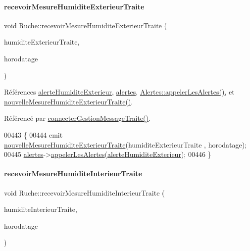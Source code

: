 \paragraph{\texorpdfstring{recevoir\+Mesure\+Humidite\+Exterieur\+Traite}{recevoirMesureHumiditeExterieurTraite}}
{\footnotesize\ttfamily void Ruche\+::recevoir\+Mesure\+Humidite\+Exterieur\+Traite (\begin{DoxyParamCaption}\item[{double}]{humidite\+Exterieur\+Traite,  }\item[{Q\+String}]{horodatage }\end{DoxyParamCaption})\hspace{0.3cm}{\ttfamily [slot]}}



Références \hyperlink{parametres_8h_a83a725fd153179a2bd97afcc8307737bacda66fabe33c8c197f8ff098a952fca3}{alerte\+Humidite\+Exterieur}, \hyperlink{class_ruche_af07644ddce44cb5ed4286475dc0f9d46}{alertes}, \hyperlink{class_alertes_ad04a02dcc6e6f14da0784c7054888b05}{Alertes\+::appeler\+Les\+Alertes()}, et \hyperlink{class_ruche_a9dc15aec6973ca8f565960a51f7f0a6b}{nouvelle\+Mesure\+Humidite\+Exterieur\+Traite()}.



Référencé par \hyperlink{class_ruche_a20ec8c6dc931218e5cf682050fe845d9}{connecter\+Gestion\+Message\+Traite()}.


\begin{DoxyCode}
00443 \{
00444     emit \hyperlink{class_ruche_a9dc15aec6973ca8f565960a51f7f0a6b}{nouvelleMesureHumiditeExterieurTraite}(humiditeExterieurTraite
      , horodatage);
00445     \hyperlink{class_ruche_af07644ddce44cb5ed4286475dc0f9d46}{alertes}->\hyperlink{class_alertes_ad04a02dcc6e6f14da0784c7054888b05}{appelerLesAlertes}(\hyperlink{parametres_8h_a83a725fd153179a2bd97afcc8307737bacda66fabe33c8c197f8ff098a952fca3}{alerteHumiditeExterieur});
00446 \}
\end{DoxyCode}
\mbox{\label{class_ruche_aab8b4958b32aad9af790963903e4788e}} 
\paragraph{\texorpdfstring{recevoir\+Mesure\+Humidite\+Interieur\+Traite}{recevoirMesureHumiditeInterieurTraite}}
{\footnotesize\ttfamily void Ruche\+::recevoir\+Mesure\+Humidite\+Interieur\+Traite (\begin{DoxyParamCaption}\item[{double}]{humidite\+Interieur\+Traite,  }\item[{Q\+String}]{horodatage }\end{DoxyParamCaption})\hspace{0.3cm}{\ttfamily [slot]}}



